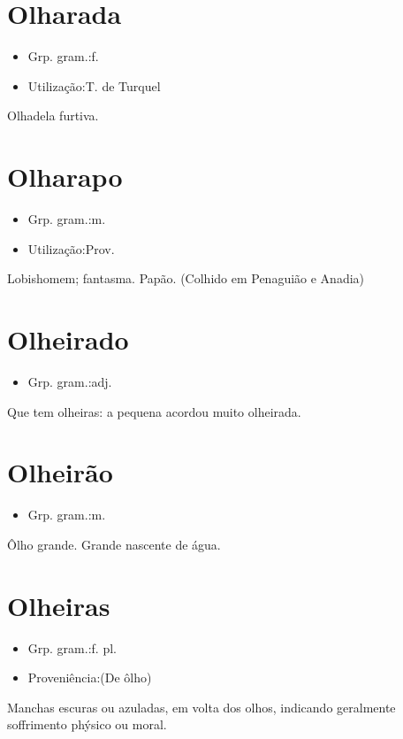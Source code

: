 \section{Olharada}
\begin{itemize}
\item {Grp. gram.:f.}
\end{itemize}
\begin{itemize}
\item {Utilização:T. de Turquel}
\end{itemize}
Olhadela furtiva.
\section{Olharapo}
\begin{itemize}
\item {Grp. gram.:m.}
\end{itemize}
\begin{itemize}
\item {Utilização:Prov.}
\end{itemize}
Lobishomem; fantasma.
Papão. (Colhido em Penaguião e Anadia)
\section{Olheirado}
\begin{itemize}
\item {Grp. gram.:adj.}
\end{itemize}
Que tem olheiras: \textunderscore a pequena acordou muito olheirada\textunderscore .
\section{Olheirão}
\begin{itemize}
\item {Grp. gram.:m.}
\end{itemize}
Ôlho grande.
Grande nascente de água.
\section{Olheiras}
\begin{itemize}
\item {Grp. gram.:f. pl.}
\end{itemize}
\begin{itemize}
\item {Proveniência:(De \textunderscore ôlho\textunderscore )}
\end{itemize}
Manchas escuras ou azuladas, em volta dos olhos, indicando geralmente soffrimento phýsico ou moral.
